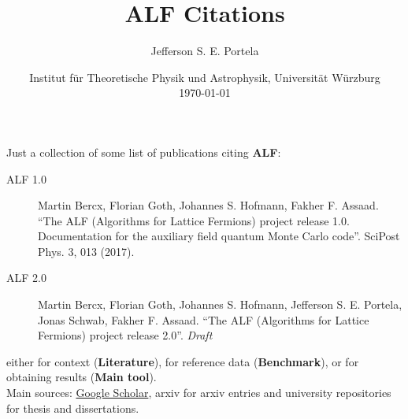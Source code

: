 \documentclass[9pt]{article}
\begin{document}
	
\title{ALF Citations}
\author{Jefferson S. E. Portela}
\date{Institut f\"ur Theoretische Physik und Astrophysik, Universit\"at W\"urzburg\\  \vspace{1mm} \today}
\maketitle

\noindent Just a collection of some list of publications citing \textbf{ALF}:
\begin{description}
	\item[ALF 1.0] Martin Bercx, Florian Goth, Johannes S. Hofmann, Fakher F. Assaad. ``The ALF (Algorithms for Lattice Fermions) project release 1.0. Documentation for the auxiliary field quantum Monte Carlo code''. SciPost Phys. 3, 013 (2017).
	\item[ALF 2.0] Martin Bercx,  Florian Goth,  Johannes S. Hofmann, Jefferson S. E. Portela, Jonas Schwab, Fakher F. Assaad. ``The ALF (Algorithms for Lattice Fermions) project release 2.0''. \emph{Draft}
\end{description}
either for context (\textbf{Literature}), for reference data (\textbf{Benchmark}), or for obtaining results (\textbf{Main tool}).\\

Main sources: \href{https://scholar.google.com/scholar?hl=en&as_sdt=2005&sciodt=0,5&cites=12604965965544777542&scipsc=&q=&scisbd=1}{Google Scholar}, arxiv for arxiv entries and university repositories for thesis and dissertations.


\nocite{*}

\printbibtabular[title={How ALF 1.0 is cited}, keyword=ALF1]

\vspace{10mm}
\printbibtabular[title={Citations with no ALF Team member participation}, notkeyword={ALFgroup}, notkeyword={ALFmember}]

\vspace{10mm}
\printbibtabular[title={Citations from \emph{papers} with no ALF Team member participation}, notkeyword={ALFgroup}, notkeyword={ALFmember}, type=article]

\vspace{10mm}
\printbibliography[title={Full Bibliography}]
\end{document}
